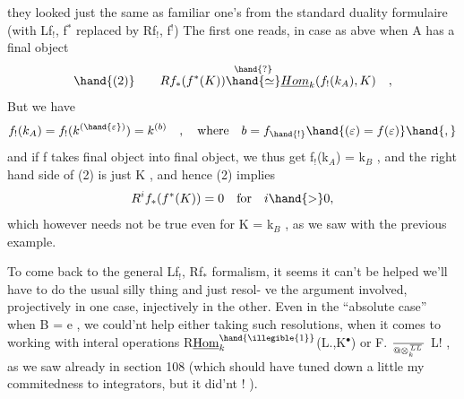 
they looked just the same as familiar  one's from the standard
duality formulaire (with Lf$_{!}$, f$^*$ replaced by Rf$_{!}$, f$^{!}$) The first
one reads, in case as abve when A has a final object \hand{$\varepsilon$}
\[ \hand{\text{(2)}} \qquad Rf_*(f^*(K)) \overset{\hand{?}}{\hand{\simeq}} \underline{Hom}_k(f_{!}(k_A),K) \quad , \]
\deleted{\[ Rf_*(f^*(K)) \quad f_*(f^*(K)) \quad \text{i.e.} \quad R^if_*(f^*(K))= 0 \text{ for } i \ 0 \]}
But we have
\[ f_{!}(k_A) = f_{!}(k^{(\hand{\varepsilon})}) = k^{(b)} \quad , \quad \text{where} \quad b = f_{\hand{!}}\hand{(\varepsilon) = f(\varepsilon)}\hand{,} \]
and if f takes final object into final object, we thus get
f$_{!}$(k$_A$) = k$_B$ , and the right hand side of (2) is just K , and hence
(2) implies 
\[ R^if_*(f^*(K)) = 0 \quad \text{for} \quad i \hand{>} 0 , \]
which however needs not be true even for K = k$_B$ , as we saw with the
previous example.

To come back to the general Lf$_{!}$, Rf$_*$ formalism, it seems it
can't be helped we'll have to do the usual silly thing and just resol-%
ve the argument involved, projectively in one case, injectively in
the other. Even in the ``absolute case'' when B = e , we could'nt help
either taking such resolutions, when it comes to working with 
interal operations  R$\underline{\mathrm{Hom}}^{\hand{\illegible{1}}}_k$(L.,K$^\bullet$) or F. $\over{@}{\otimes}^{\over{L}{L}}_k$ L! , as we saw already
in section 108 (which should have tuned down a little my commitedness
to integrators, but it did'nt ! ).

